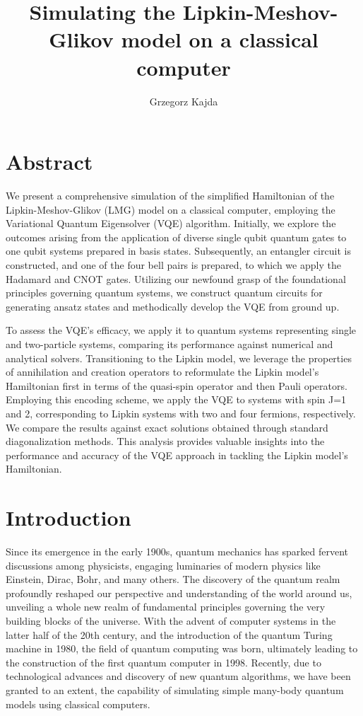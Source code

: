 \documentclass[onecolumn,10pt,cleanfoot]{asme2ej}
\author{Grzegorz Kajda
    \affiliation{
	Bachelor Student, Robotics and Intelligent Systems\\ \\[-10pt]
	Department of Informatics The faculty of Mathematics and Natural Sciences\\ \\[-10pt]
    Email: grzegork@ifi.uio.no
    }
}
\begin{document}
\title{Simulating the Lipkin-Meshov-Glikov model on a classical computer}

\maketitle

\section{Abstract}

We present a comprehensive simulation of the simplified Hamiltonian of the Lipkin-Meshov-Glikov (LMG) model on a classical computer, employing the Variational Quantum Eigensolver (VQE) algorithm. Initially, we explore the outcomes arising from the application of diverse single qubit quantum gates to one qubit systems prepared in basis states. Subsequently, an entangler circuit is constructed, and one of the four bell pairs is prepared, to which we apply the Hadamard and CNOT gates. Utilizing our newfound grasp of the foundational principles governing quantum systems, we construct quantum circuits for generating ansatz states and methodically develop the VQE from ground up.

To assess the VQE's efficacy, we apply it to quantum systems representing single and two-particle systems, comparing its performance against numerical and analytical solvers. Transitioning to the Lipkin model, we leverage the properties of annihilation and creation operators to reformulate the Lipkin model's Hamiltonian first in terms of the quasi-spin operator and then Pauli operators. Employing this encoding scheme, we apply the VQE to systems with spin J=1 and 2, corresponding to Lipkin systems with two and four fermions, respectively. We compare the results against exact solutions obtained through standard diagonalization methods. This analysis provides valuable insights into the performance and accuracy of the VQE approach in tackling the Lipkin model's Hamiltonian.
	

\section{Introduction}
Since its emergence in the early 1900s, quantum mechanics has sparked fervent discussions among physicists, engaging luminaries of modern physics like Einstein, Dirac, Bohr, and many others. The discovery of the quantum realm profoundly reshaped our perspective and understanding of the world around us, unveiling a whole new realm of fundamental principles governing the very building blocks of the universe. With the advent of computer systems in the latter half of the 20th century, and the introduction of the quantum Turing machine in 1980, the field of quantum computing was born, ultimately leading to the construction of the first quantum computer in 1998. Recently, due to technological advances and discovery of new quantum algorithms, we have been granted to an extent, the capability of simulating simple many-body quantum models using classical computers.
\end{document}
